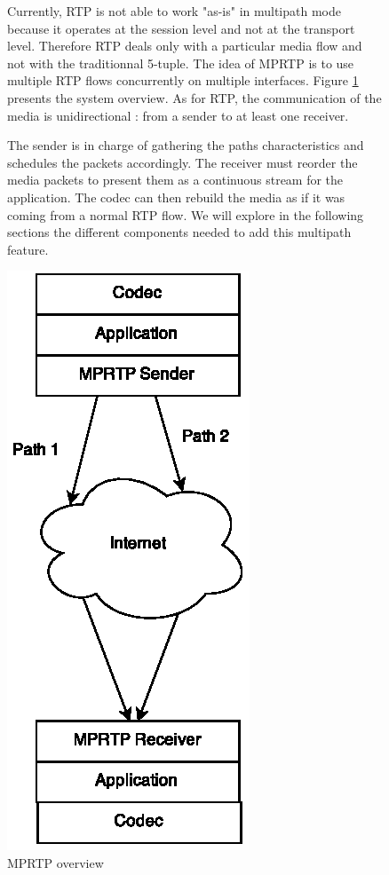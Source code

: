 \begin{figure}[!h]

\begin{minipage}[c]{0.55\linewidth}

Currently, RTP is not able to work "as-is" in multipath mode because it operates at the session level and not at the transport level. Therefore RTP deals only with a particular media flow and not with the traditionnal 5-tuple. The idea of MPRTP is to use multiple RTP flows concurrently on multiple interfaces. Figure \ref{fig:mprtp-concept} presents the system overview. As for RTP, the communication of the media is unidirectional : from a sender to at least one receiver.

\vspace{10pt}

The sender is in charge of gathering the paths characteristics and schedules the packets accordingly. The receiver must reorder the media packets to present them as a continuous stream for the application. The codec can then rebuild the media as if it was coming from a normal RTP flow. We will explore in the following sections the different components needed to add this multipath feature.

\end{minipage}
\begin{minipage}{0.44\linewidth}
\centering

\includegraphics{images/mprtp-overview}
\caption[MPRTP overview]{MPRTP overview}
\label{fig:mprtp-concept}

\end{minipage}

\end{figure}

